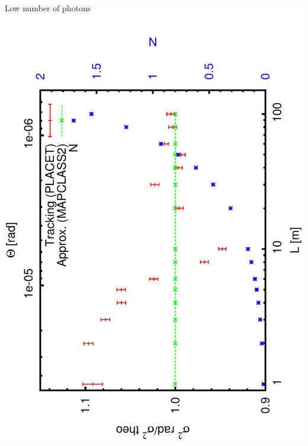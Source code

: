 \documentclass{beamer}
\begin{document}
\begin{frame}{Low number of photons}
\includegraphics[scale=0.22,angle=-90]{sigma_Bfix5e-3T.pdf}

\end{frame}
\end{document}
